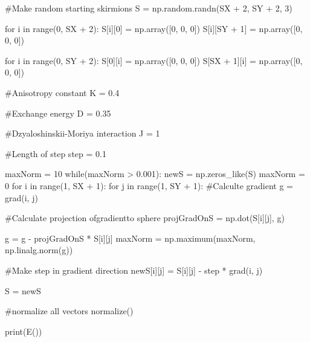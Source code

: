 \documentclass[ 12pt,x11names]{article}
\begin{document}
\begin{python}
    #Make random starting skirmions
    S = np.random.randn(SX + 2, SY + 2, 3)

    for i in range(0, SX + 2):
        S[i][0] = np.array([0, 0, 0])
        S[i][SY + 1] = np.array([0, 0, 0])

    for i in range(0, SY + 2):
        S[0][i] = np.array([0, 0, 0])
        S[SX + 1][i] = np.array([0, 0, 0])

    #Anisotropy constant
    K = 0.4

    #Exchange energy
    D = 0.35

    #Dzyaloshinskii-Moriya interaction
    J = 1

    #Length of step
    step = 0.1

    maxNorm = 10
    while(maxNorm > 0.001):
        newS = np.zeros_like(S)
        maxNorm = 0
        for i in range(1, SX + 1):
            for j in range(1, SY + 1):
                #Calculte gradient
                g = grad(i,  j)

                #Calculate projection ofgradientto sphere
                projGradOnS = np.dot(S[i][j], g)

                g = g - projGradOnS * S[i][j]
                maxNorm = np.maximum(maxNorm, np.linalg.norm(g))

                #Make step in gradient direction
                newS[i][j] = S[i][j] - step * grad(i, j)

        S = newS

        #normalize all vectors
        normalize()

print(E())
\end{python}
\end{document}
